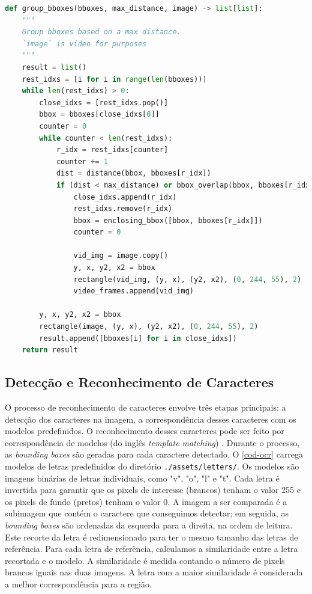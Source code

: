 \documentclass[english, 
               brazil, 
               bsc] %
               {dcomp-abntex2}
\begin{document}
\begin{codigo}[h]
  \caption{\small.}
 \label{cod-group_bboxes}
\begin{lstlisting}[language=python]
def group_bboxes(bboxes, max_distance, image) -> list[list]:
    """
    Group bboxes based on a max distance.
    `image` is video for purposes
    """
    result = list()
    rest_idxs = [i for i in range(len(bboxes))]
    while len(rest_idxs) > 0:
        close_idxs = [rest_idxs.pop()]
        bbox = bboxes[close_idxs[0]]
        counter = 0
        while counter < len(rest_idxs):
            r_idx = rest_idxs[counter]
            counter += 1
            dist = distance(bbox, bboxes[r_idx])
            if (dist < max_distance) or bbox_overlap(bbox, bboxes[r_idx]):
                close_idxs.append(r_idx)
                rest_idxs.remove(r_idx)
                bbox = enclosing_bbox([bbox, bboxes[r_idx]])
                counter = 0

                vid_img = image.copy()
                y, x, y2, x2 = bbox
                rectangle(vid_img, (y, x), (y2, x2), (0, 244, 55), 2)
                video_frames.append(vid_img)

        y, x, y2, x2 = bbox
        rectangle(image, (y, x), (y2, x2), (0, 244, 55), 2)
        result.append([bboxes[i] for i in close_idxs])
    return result
\end{lstlisting}
\end{codigo}

\subsection{Detecção e Reconhecimento de Caracteres}


O processo de reconhecimento de caracteres envolve três etapas principais: a detecção dos caracteres na imagem, a correspondência desses caracteres com os modelos predefinidos. O reconhecimento desses caracteres pode ser feito por correspondência de modelos (do inglês \textit{template matching}) \cite[12.2]{gonzalez2008digital}.  Durante o processo, as \textit{bounding boxes} são geradas para cada caractere detectado. O \autoref{cod-ocr} carrega modelos de letras predefinidos do diretório \texttt{./assets/letters/}. Os modelos são imagens binárias de letras individuais, como "v", "o", "l" e "t". Cada letra é invertida para garantir que os pixels de interesse (brancos) tenham o valor 255 e os pixels de fundo (pretos) tenham o valor 0. A imagem a ser comparada é a subimagem que contém o caractere que conseguimos detectar; em seguida, as \textit{bounding boxes} são ordenadas da esquerda para a direita, na ordem de leitura. Este recorte da letra é redimensionado para ter o mesmo tamanho das letras de referência. Para cada letra de referência, calculamos a similaridade entre a letra recortada e o modelo. A similaridade é medida contando o número de pixels brancos iguais nas duas imagens. A letra com a maior similaridade é considerada a melhor correspondência para a região.
\end{document}
